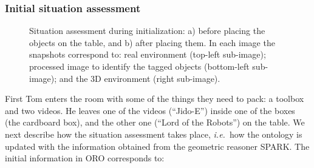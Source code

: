 \documentclass[twocolumn]{svjour3}
\newcommand{\ie}{{\textit{i.e.~}}}
\begin{document}
\subsubsection{Initial situation assessment}

\begin{figure}[!t]
\centering
	\caption{Situation assessment during initialization: a) before placing the
	objects on the table, and b) after placing them. In each image the snapshots
	correspond to: real environment (top-left sub-image); processed image to
	identify the tagged objects (bottom-left sub-image); and the 3D environment
	(right sub-image).}
	\label{fig|sitAssessRoman}
\end{figure}

First Tom enters the room with some of the things they need to pack: a
toolbox and two videos. He leaves one of the videos (``Jido-E'') inside one of
the boxes (the cardboard box), and the other one (``Lord of the Robots'') on the
table. We next describe how the situation assessment takes place, \ie how the
ontology is updated with the information obtained from the geometric reasoner
SPARK.
The initial information in ORO corresponds to:
\end{document}
